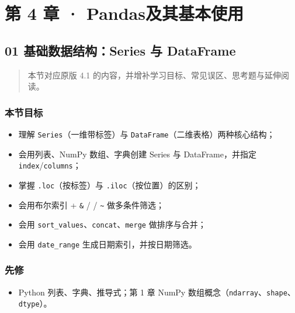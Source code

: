 \chapter{第 4 章 ·
Pandas及其基本使用}\label{ux7b2c-4-ux7ae0-pandasux53caux5176ux57faux672cux4f7fux7528}

\section{01 基础数据结构：Series 与
DataFrame}\label{ux57faux7840ux6570ux636eux7ed3ux6784series-ux4e0e-dataframe}

\begin{quote}
本节对应原版 4.1 的内容，并增补学习目标、常见误区、思考题与延伸阅读。
\end{quote}

\subsection{本节目标}\label{ux672cux8282ux76eeux6807-18}

\begin{itemize}
\tightlist
\item
  理解 \texttt{Series}（一维带标签）与
  \texttt{DataFrame}（二维表格）两种核心结构；
\item
  会用列表、NumPy 数组、字典创建 Series 与 DataFrame，并指定
  \texttt{index}/\texttt{columns}；
\item
  掌握 \texttt{.loc}（按标签）与 \texttt{.iloc}（按位置）的区别；
\item
  会用布尔索引 + \texttt{\&} / \texttt{\textbar{}} /
  \texttt{\textasciitilde{}} 做多条件筛选；
\item
  会用 \texttt{sort\_values}、\texttt{concat}、\texttt{merge}
  做排序与合并；
\item
  会用 \texttt{date\_range} 生成日期索引，并按日期筛选。
\end{itemize}

\subsection{先修}\label{ux5148ux4fee-11}

\begin{itemize}
\tightlist
\item
  Python 列表、字典、推导式；第 1 章 NumPy
  数组概念（\texttt{ndarray}、\texttt{shape}、\texttt{dtype}）。
\end{itemize}

